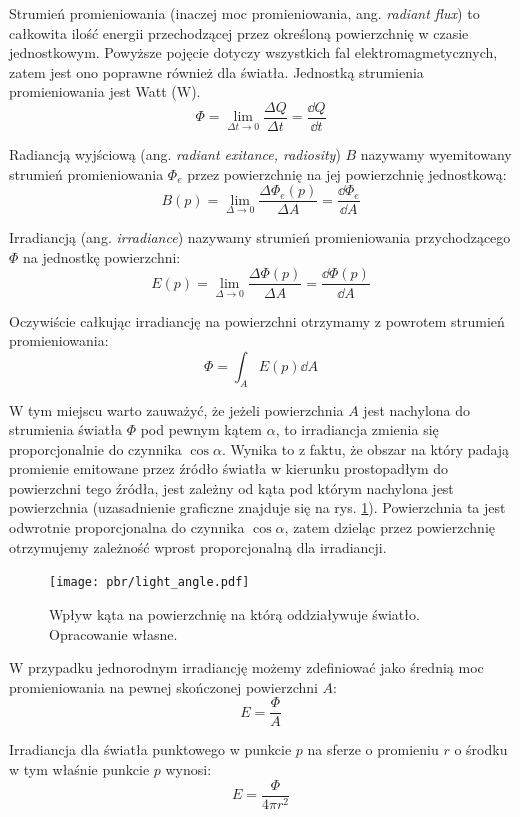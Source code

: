 \documentclass[../main.tex]{subfiles}
\begin{document}
Strumień promieniowania (inaczej moc promieniowania, ang. \textit{radiant flux}) to całkowita ilość energii przechodzącej przez określoną powierzchnię w czasie jednostkowym. Powyższe pojęcie dotyczy wszystkich fal elektromagmetycznych, zatem jest ono poprawne również dla światła. Jednostką strumienia promieniowania jest Watt ($\si{\watt}$).
\[
\Phi = 
    \lim_{\Delta t \rightarrow 0}{
        \frac{\Delta Q}{\Delta t}
    } 
    = \frac{\dd Q}{\dd t}
\]


Radiancją wyjściową (ang. \textit{radiant exitance, radiosity}) $B$ nazywamy wyemitowany strumień promieniowania $\Phi_{e}$ przez powierzchnię na jej powierzchnię jednostkową:
\[
B(p) = 
    \lim_{\Delta \rightarrow 0}{
        \frac{\Delta \Phi_{e}(p)}{\Delta A}
    } 
    = \frac{\dd \Phi_{e}}{\dd A}
\]  

Irradiancją (ang. \textit{irradiance}) nazywamy strumień promieniowania przychodzącego $\Phi$ na jednostkę powierzchni:
\[
E(p) =
    \lim_{\Delta \rightarrow 0} {
        \frac{\Delta \Phi(p)}{\Delta A}
    } =
    \frac{\dd \Phi(p)}{\dd A}
\]

Oczywiście całkując irradiancję na powierzchni otrzymamy z powrotem strumień promieniowania:
\[
\Phi = \int_{A} {
    E(p)
    \dd A
}
\]

W tym miejscu warto zauważyć, że jeżeli powierzchnia $A$ jest nachylona do
strumienia światła $\Phi$ pod pewnym kątem $\alpha$, to irradiancja zmienia się
proporcjonalnie do czynnika $\cos \alpha$. Wynika to z faktu, że obszar na
który padają promienie emitowane przez źródło światła w kierunku prostopadłym
do powierzchni tego źródła, jest zależny od kąta pod którym nachylona jest
powierzchnia (uzasadnienie graficzne znajduje się na rys. \ref{fig:SourceLightAngle}). Powierzchnia ta jest odwrotnie proporcjonalna do czynnika $\cos \alpha$, zatem dzieląc przez powierzchnię otrzymujemy zależność wprost proporcjonalną dla irradiancji.

\begin{figure}[ht]
  \centering
  \texttt{[image: pbr/light\_angle.pdf]}
  \caption{Wpływ kąta na powierzchnię na którą oddziaływuje światło. Opracowanie własne.}
  \label{fig:SourceLightAngle}
\end{figure}

W przypadku jednorodnym irradiancję możemy zdefiniować jako średnią moc
promieniowania na pewnej skończonej powierzchni $A$:
\[
    E = \frac{\Phi}{A}
\]

\begin{example}
  Irradiancja dla światła punktowego w punkcie $p$ na sferze o
  promieniu $r$ o środku w tym właśnie punkcie $p$ wynosi:
  \[
    E = \frac{\Phi}{4 \pi r^2}
  \]
\end{example}
\end{document}
